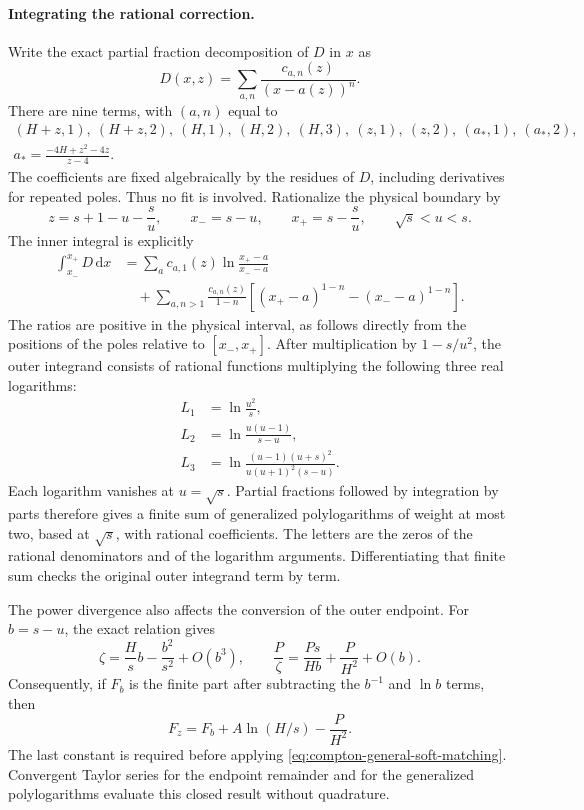 \paragraph{Integrating the rational correction.}
Write the exact partial fraction decomposition of $D$ in $x$ as
\begin{equation}
 D(x,z)=\sum_{a,n}\frac{c_{a,n}(z)}{(x-a(z))^n}.
\end{equation}
There are nine terms, with $(a,n)$ equal to
\begin{gather}
 (H+z,1),\ (H+z,2),\ (H,1),\ (H,2),\ (H,3),\
 (z,1),\ (z,2),\ (a_*,1),\ (a_*,2),\\
 a_* = \frac{-4H+z^2-4z}{z-4}.
\end{gather}
The coefficients are fixed algebraically by the residues of $D$, including
 derivatives for repeated poles.  Thus no fit is involved.  Rationalize
the physical boundary by
\begin{equation}
 z=s+1-u-\frac{s}{u},\qquad
 x_-=s-u,\qquad x_+=s-\frac{s}{u},\qquad \sqrt{s}<u<s.
\end{equation}
The inner integral is explicitly
\begin{align}
 \int_{x_-}^{x_+}D\,\mathrm{d}x
 &=\sum_a c_{a,1}(z)\ln\frac{x_+-a}{x_--a}\\
 &\quad+\sum_{a,n>1}\frac{c_{a,n}(z)}{1-n}
 \left[(x_+-a)^{1-n}-(x_--a)^{1-n}\right].
\end{align}
The ratios are positive in the physical interval, as follows directly
from the positions of the poles relative to $[x_-,x_+]$.
After multiplication by $1-s/u^2$, the outer integrand consists of rational
functions multiplying the following three real logarithms:
\begin{align}
 L_1&=\ln\frac{u^2}{s},\\
 L_2&=\ln\frac{u(u-1)}{s-u},\\
 L_3&=\ln\frac{(u-1)(u+s)^2}{u(u+1)^2(s-u)}.
\end{align}
Each logarithm vanishes at $u=\sqrt{s}$.  Partial fractions followed by
integration by parts therefore gives a finite sum of generalized
polylogarithms of weight at most two, based at $\sqrt{s}$, with rational
coefficients.  The letters are the zeros of the rational denominators and
of the logarithm arguments.  Differentiating that finite sum checks the
original outer integrand term by term.

The power divergence also affects the conversion of the outer endpoint.
For $b=s-u$, the exact relation gives
\begin{equation}
 \zeta=\frac{H}{s}b-\frac{b^2}{s^2}+O(b^3),\qquad
 \frac{P}{\zeta}=\frac{Ps}{Hb}+\frac{P}{H^2}+O(b).
\end{equation}
Consequently, if $F_b$ is the finite part after subtracting the
$b^{-1}$ and $\ln b$ terms, then
\begin{equation}
 F_z=F_b+A\ln(H/s)-\frac{P}{H^2}.
\end{equation}
The last constant is required before applying
\eqref{eq:compton-general-soft-matching}.  Convergent Taylor series for the
endpoint remainder and for the generalized polylogarithms evaluate this
closed result without quadrature.
